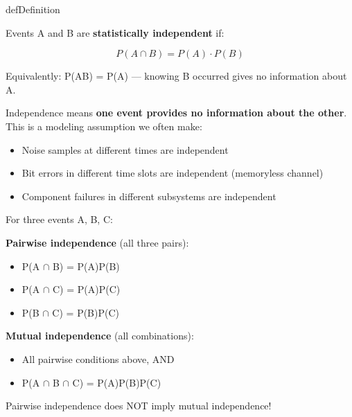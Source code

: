 
\begin{PSbox}[unbreakable]{def}{Definition}

Events A and B are \textbf{statistically independent} if:

\[P(A \cap B) = P(A) \cdot P(B)\]

Equivalently: P(A\textbar{}B) = P(A) — knowing B occurred gives no information about A.

\end{PSbox}


Independence means \textbf{one event provides no information about the other}. This is a modeling assumption we often make:

\begin{itemize}
\tightlist
\item
  Noise samples at different times are independent
\item
  Bit errors in different time slots are independent (memoryless channel)
\item
  Component failures in different subsystems are independent
\end{itemize}


For three events A, B, C:

\textbf{Pairwise independence} (all three pairs):

\begin{itemize}
\tightlist
\item
  P(A \ensuremath{\cap} B) = P(A)P(B)
\item
  P(A \ensuremath{\cap} C) = P(A)P(C)
\item
  P(B \ensuremath{\cap} C) = P(B)P(C)
\end{itemize}

\textbf{Mutual independence} (all combinations):

\begin{itemize}
\tightlist
\item
  All pairwise conditions above, AND
\item
  P(A \ensuremath{\cap} B \ensuremath{\cap} C) = P(A)P(B)P(C)
\end{itemize}

\begin{PSquote}

\PSwarn{} Pairwise independence does NOT imply mutual independence!

\end{PSquote}

